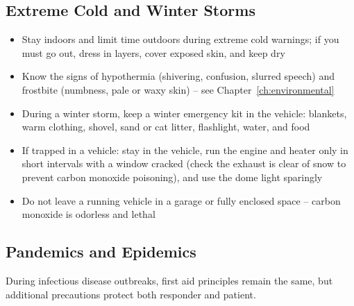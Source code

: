 \subsection{Extreme Cold and Winter Storms}

\begin{itemize}
  \item Stay indoors and limit time outdoors during extreme cold warnings; if you must go out, dress in layers, cover exposed skin, and keep dry
  \item Know the signs of hypothermia (shivering, confusion, slurred speech) and frostbite (numbness, pale or waxy skin) -- see Chapter~\ref{ch:environmental}
  \item During a winter storm, keep a winter emergency kit in the vehicle: blankets, warm clothing, shovel, sand or cat litter, flashlight, water, and food
  \item If trapped in a vehicle: stay in the vehicle, run the engine and heater only in short intervals with a window cracked (check the exhaust is clear of snow to prevent carbon monoxide poisoning), and use the dome light sparingly
  \item Do not leave a running vehicle in a garage or fully enclosed space -- carbon monoxide is odorless and lethal
\end{itemize}

\subsection{Pandemics and Epidemics}

During infectious disease outbreaks, first aid principles remain the same, but additional precautions protect both responder and patient.

